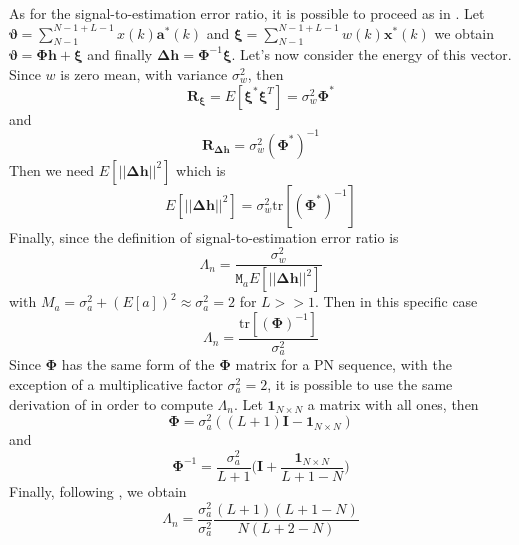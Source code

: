 \documentclass[10pt]{article}
\newcommand{\M} {\mathtt{M}}
\begin{document}
As for the signal-to-estimation error ratio, it is possible to proceed as in \cite{bc}. Let $\boldsymbol{\vartheta} = \sum_{N-1}^{N-1+L-1} x(k) \mathbf{a}^*(k)$ and $\boldsymbol{\xi} = \sum_{N-1}^{N-1+L-1} w(k) \mathbf{x}^*(k)$ we obtain $\boldsymbol{\vartheta} = \boldsymbol{\Phi}\mathbf{h} + \boldsymbol{\xi}$ and finally $\boldsymbol{\Delta h} = \boldsymbol{\Phi}^{-1} \boldsymbol{\xi}$. 
Let's now consider the energy of this vector. Since $w$ is zero mean, with variance $\sigma_w^2$, then
\begin{equation}
	\mathbf{R}_{\boldsymbol{\xi}} = E[\boldsymbol{\xi}^*\boldsymbol{\xi}^T] = \sigma_w^2 \mathbf{\Phi}^*
\end{equation}
and
\begin{equation}
	\mathbf{R}_{\boldsymbol{\Delta h}} = \sigma_w^2 (\mathbf{\Phi}^*)^{-1}
\end{equation}
Then we need $E[||\mathbf{\Delta h}||^2]$ which is
\begin{equation}
	E[||\mathbf{\Delta h}||^2] = \sigma_w^2 \mbox{tr}[(\mathbf{\Phi}^*)^{-1}]
\end{equation}
Finally, since the definition of signal-to-estimation error ratio is 
\begin{equation}
	\Lambda_n = \frac{\sigma_w^2}{\M_a E[||\mathbf{\Delta h}||^2]}
\end{equation}
with $M_a = \sigma_a^2 + (E[a])^2 \approx \sigma_a^2 = 2$ for $L >> 1$. Then in this specific case
\begin{equation}
	\Lambda_n = \frac{\mbox{tr}[(\mathbf{\Phi})^{-1}]}{\sigma_a^2}
\end{equation}
Since $\mathbf{\Phi}$ has the same form of the $\mathbf{\Phi}$ matrix for a PN sequence, with the exception of a multiplicative factor $\sigma_a^2 = 2$, it is possible to use the same derivation of \cite{bc} in order to compute $\Lambda_n$. Let $\mathbf{1}_{N\times N}$ a matrix with all ones, then
\begin{equation}
	\mathbf{\Phi} = \sigma_a^2 ((L+1)\mathbf{I} - \mathbf{1}_{N\times N})
\end{equation}
and
\begin{equation}
	\mathbf{\Phi}^{-1} = \frac{\sigma_a^2}{L+1} \bigg( \mathbf{I} + \frac{\mathbf{1}_{N\times N}}{L+1-N} \bigg)
\end{equation}
Finally, following \cite{bc}, we obtain
\begin{equation}
	\Lambda_n = \frac{\sigma_a^2}{\sigma_a^2}\frac{(L+1)(L+1-N)}{N(L+2-N)}
	\label{eq:lambdateo}
\end{equation}
\end{document}

